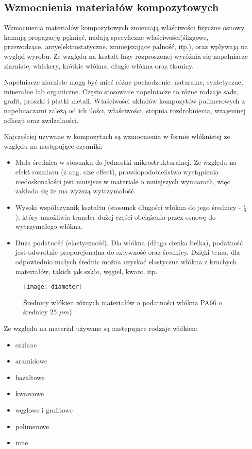 \documentclass[magister,druk]{dyplom}
\begin{document}
\subsection{Wzmocnienia materiałów kompozytowych}

Wzmocnienia materiałów kompozytowych zmieniają właściwości fizyczne osnowy, hamują propagację pęknięć, nadają specyficzne właściwości(ślizgowe, przewodzące, antyelektrostatyczne, zmniejszające palność, itp.), oraz wpływają na wygląd wyrobu. Ze względu na kształt fazy rozproszonej wyróżnia się napełniacze ziarniste, whiskery, krótkie włókna, długie włókna oraz tkaniny. 

Napełniacze ziarniste mogą być mieć różne pochodzenie: naturalne, syntetyczne, mineralne lub organiczne. Często stosowane napełniacze to różne rodzaje sadz, grafit, proszki i płatki metali. Właściwości układów kompozytów polimerowych z napełniaczami zależą od ich ilości, właściwości, stopnia rozdrobnienia, wzajemnej adhezji oraz zwilżalności. 

Najczęściej używane w kompozytach są wzmocnienia w formie włóknistej ze względu na 
następujące czynniki\cite{Dresher}:
\begin{itemize}
	\item Mała średnica w stosunku do jednostki mikrostrukturalnej. Ze względu na efekt rozmiaru (z ang. size effect), prawdopodobieństwo wystąpienia niedoskonałości jest mniejsze w materiale o mniejszych wymiarach, więc zakłada się że ma wyższą wytrzymałość.
	\item Wysoki współczynnik kształtu (stosunek długości włókna do jego średnicy - $\frac{l}{d}$), który umożliwia transfer dużej części obciążenia przez osnowę do wytrzymałego włókna.
	\item Duża podatność (elastyczność). Dla włókna (długa cienka belka), podatność jest odwrotnie proporcjonalna do sztywność oraz średnicy\cite{Chawla1998}. Dzięki temu, dla odpowiednio małych średnic można uzyskać elastyczne włókna z kruchych materiałów, takich jak szkło, węgiel, kwarc, itp.    
\end{itemize}

\begin{figure}[H]
	\centering
	\texttt{[image: diameter]}
	\caption{Średnicy włókien różnych materiałów o podatności włókna PA66 o średnicy 25 $\mu m$)\cite{Chawla1998}}
\end{figure}

Ze względu na materiał używane są następujące rodzaje włókien:
\begin{itemize}
	\item szklane
	\item aramidowe
	\item bazaltowe
	\item kwarcowe
	\item węglowe i grafitowe
	\item polimerowe
	\item inne
\end{itemize}
\end{document}
